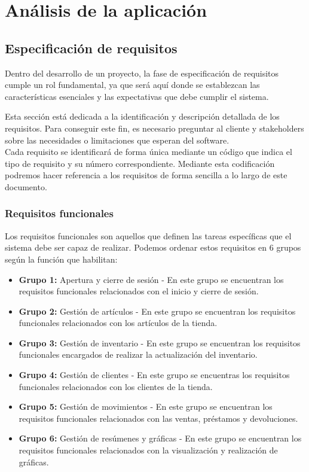 \chapter{Análisis de la aplicación}
\label{chap:analysis}

\section{Especificación de requisitos}

Dentro del desarrollo de un proyecto, la fase de especificación de requisitos cumple un rol fundamental, ya que será aquí donde se establezcan las características esenciales y las expectativas que debe cumplir el sistema. 

Esta sección está dedicada a la identificación y descripción detallada de los requisitos. Para conseguir este fin, es necesario preguntar al cliente y stakeholders sobre las necesidades o limitaciones que esperan del software.\\
 
Cada requisito se identificará de forma única mediante un código que indica el tipo de requisito y su número correspondiente. Mediante esta codificación podremos hacer referencia a los requisitos de forma sencilla a lo largo de este documento. 


\subsection{Requisitos funcionales}

Los requisitos funcionales son aquellos que definen las tareas específicas que el sistema debe ser capaz de realizar. Podemos ordenar estos requisitos en 6 grupos según la función que habilitan: 

\begin{itemize}
	\item \textbf{Grupo 1:} Apertura y cierre de sesión - En este grupo se encuentran los requisitos funcionales relacionados con el inicio y cierre de sesión.  
	\item \textbf{Grupo 2:} Gestión de artículos - En este grupo se encuentran los requisitos funcionales relacionados con los artículos de la tienda.
	\item \textbf{Grupo 3:} Gestión de inventario - En este grupo se encuentran los requisitos funcionales encargados de realizar la actualización del inventario. 
	\item \textbf{Grupo 4:} Gestión de clientes - En este grupo se encuentras los requisitos funcionales relacionados con los clientes de la tienda. 
	\item \textbf{Grupo 5:} Gestión de movimientos - En este grupo se encuentran los requisitos funcionales relacionados con las ventas, préstamos y devoluciones. 
	\item \textbf{Grupo 6:} Gestión de resúmenes y gráficas - En este grupo se encuentran los requisitos funcionales relacionados con la visualización y realización de gráficas. 
\end{itemize}

